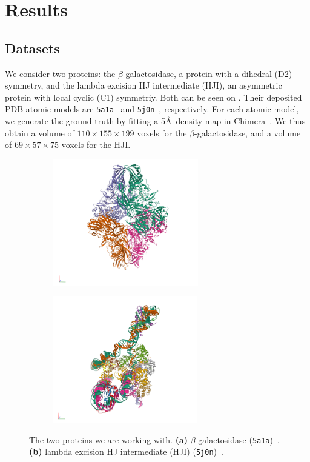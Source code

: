 \section{Results}

\subsection{Datasets}\label{sec:results:data}

We consider two proteins: the $\beta$-galactosidase, a protein with a dihedral (D2) symmetry, and the lambda excision HJ intermediate (HJI), an asymmetric protein with local cyclic (C1) symmetriy. Both can be seen on .
Their deposited PDB atomic models are \texttt{5a1a}~\cite{bartesaghi2015betagal} and \texttt{5j0n}~\cite{laxmikanthan2016structure}, respectively.
For each atomic model, we generate the ground truth by fitting a 5\AA\ density map in Chimera~\cite{pettersen2004ucsf}.
We thus obtain a volume of $110 \times 155 \times 199$ voxels for the $\beta$-galactosidase, and a volume of $69 \times 57 \times 75$ voxels for the HJI.

\begin{figure}[ht!]
    \centering
    \begin{subfigure}[b]{0.45\textwidth}
        \includegraphics[height=5.5cm]{figures/5a1a_pdb.png}
        \caption{}
    \end{subfigure}
    \begin{subfigure}[b]{0.45\textwidth}
    \centering
        \includegraphics[height=5.5cm]{figures/5j0n_pdb.png}
        \caption{}
    \end{subfigure}
    
    \caption{%
        The two proteins we are working with.
        \textbf{(a)} $\beta$-galactosidase (\texttt{5a1a})~\cite{5a1a_pdb}.
        \textbf{(b)} lambda excision HJ intermediate (HJI) (\texttt{5j0n})~\cite{5j0n_pdb}.
    }\label{fig:pdb-proteins}
\end{figure}


